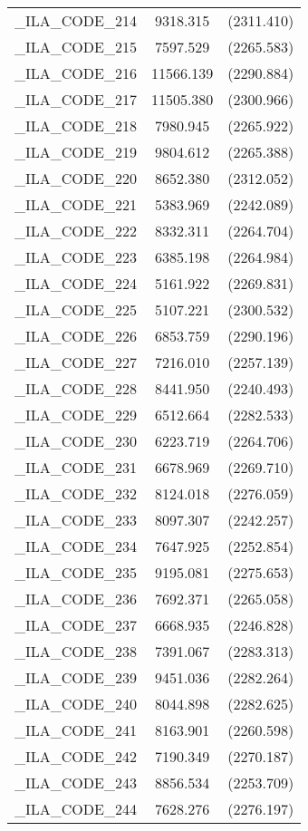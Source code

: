 {\begin{table}[htbp]
\begin{tabular}{l c c }
\_ILA\_CODE\_214  &  9318.315  & (2311.410)\\
\_ILA\_CODE\_215  &  7597.529  & (2265.583)\\
\_ILA\_CODE\_216  &  11566.139  & (2290.884)\\
\_ILA\_CODE\_217  &  11505.380  & (2300.966)\\
\_ILA\_CODE\_218  &  7980.945  & (2265.922)\\
\_ILA\_CODE\_219  &  9804.612  & (2265.388)\\
\_ILA\_CODE\_220  &  8652.380  & (2312.052)\\
\_ILA\_CODE\_221  &  5383.969  & (2242.089)\\
\_ILA\_CODE\_222  &  8332.311  & (2264.704)\\
\_ILA\_CODE\_223  &  6385.198  & (2264.984)\\
\_ILA\_CODE\_224  &  5161.922  & (2269.831)\\
\_ILA\_CODE\_225  &  5107.221  & (2300.532)\\
\_ILA\_CODE\_226  &  6853.759  & (2290.196)\\
\_ILA\_CODE\_227  &  7216.010  & (2257.139)\\
\_ILA\_CODE\_228  &  8441.950  & (2240.493)\\
\_ILA\_CODE\_229  &  6512.664  & (2282.533)\\
\_ILA\_CODE\_230  &  6223.719  & (2264.706)\\
\_ILA\_CODE\_231  &  6678.969  & (2269.710)\\
\_ILA\_CODE\_232  &  8124.018  & (2276.059)\\
\_ILA\_CODE\_233  &  8097.307  & (2242.257)\\
\_ILA\_CODE\_234  &  7647.925  & (2252.854)\\
\_ILA\_CODE\_235  &  9195.081  & (2275.653)\\
\_ILA\_CODE\_236  &  7692.371  & (2265.058)\\
\_ILA\_CODE\_237  &  6668.935  & (2246.828)\\
\_ILA\_CODE\_238  &  7391.067  & (2283.313)\\
\_ILA\_CODE\_239  &  9451.036  & (2282.264)\\
\_ILA\_CODE\_240  &  8044.898  & (2282.625)\\
\_ILA\_CODE\_241  &  8163.901  & (2260.598)\\
\_ILA\_CODE\_242  &  7190.349  & (2270.187)\\
\_ILA\_CODE\_243  &  8856.534  & (2253.709)\\
\_ILA\_CODE\_244  &  7628.276  & (2276.197)\\

\end{tabular}
\end{table}}
